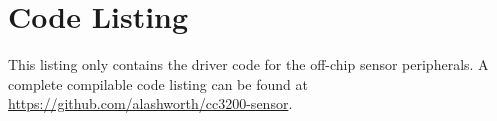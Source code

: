\chapter{Code Listing}

This listing only contains the driver code for the off-chip sensor peripherals. A complete compilable code listing can be found at \url{https://github.com/alashworth/cc3200-sensor}.




